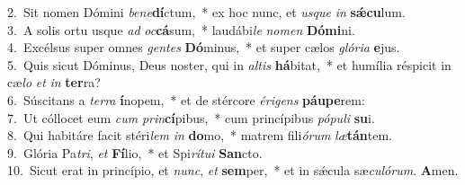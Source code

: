 {2.~}Sit nomen Dómini \textit{be}\textit{ne}\textbf{dí}ctum,~* ex hoc nunc, et \textit{us}\textit{que} \textit{in} \textbf{sǽ}\textbf{cu}lum.\\
{3.~}A solis ortu usque \textit{ad} \textit{oc}\textbf{cá}sum,~* laudábi\textit{le} \textit{no}\textit{men} \textbf{Dó}\textbf{mi}ni.\\
{4.~}Excélsus super omnes \textit{gen}\textit{tes} \textbf{Dó}minus,~* et super cælos \textit{gló}\textit{ri}\textit{a} \textbf{e}jus.\\
{5.~}Quis sicut Dóminus, Deus noster, qui in \textit{al}\textit{tis} \textbf{há}bitat,~* et humília réspicit in cæ\textit{lo} \textit{et} \textit{in} \textbf{ter}ra?\\
{6.~}Súscitans a \textit{ter}\textit{ra} \textbf{í}nopem,~* et de stércore \textit{é}\textit{ri}\textit{gens} \textbf{páu}\textbf{pe}rem:\\
{7.~}Ut cóllocet eum \textit{cum} \textit{prin}\textbf{cí}pibus,~* cum princípibus \textit{pó}\textit{pu}\textit{li} \textbf{su}i.\\
{8.~}Qui habitáre facit stéri\textit{lem} \textit{in} \textbf{do}mo,~* matrem fili\textit{ó}\textit{rum} \textit{læ}\textbf{tán}tem.\\
{9.~}Glória Pa\textit{tri}, \textit{et} \textbf{Fí}lio,~* et Spi\textit{rí}\textit{tu}\textit{i} \textbf{San}cto.\\
{10.~}Sicut erat in princípio, et \textit{nunc}, \textit{et} \textbf{sem}per,~* et in sǽcula sæ\textit{cu}\textit{ló}\textit{rum}. \textbf{A}men.\\
